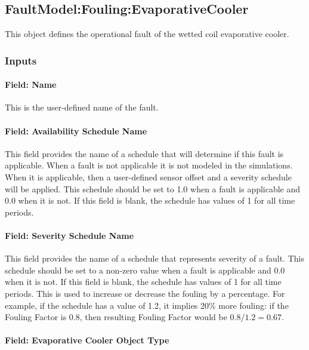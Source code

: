 \subsection{FaultModel:Fouling:EvaporativeCooler}\label{faultmodelfoulingevapcooler}

This object defines the operational fault of the wetted coil evaporative cooler.

\subsubsection{Inputs}

\paragraph{Field: Name}

This is the user-defined name of the fault.

\paragraph{Field: Availability Schedule Name}

This field provides the name of a schedule that will determine if this fault is applicable. When a fault is not applicable it is not modeled in the simulations. When it is applicable, then a user-defined sensor offset and a severity schedule will be applied. This schedule should be set to 1.0 when a fault is applicable and 0.0 when it is not. If this field is blank, the schedule has values of 1 for all time periods.

\paragraph{Field: Severity Schedule Name}

This field provides the name of a schedule that represents severity of a fault. This schedule should be set to a non-zero value when a fault is applicable and 0.0 when it is not. If this field is blank, the schedule has values of 1 for all time periods.
This is used to increase or decrease the fouling by a percentage. For example, if the schedule has a value of 1.2, it implies 20\% more fouling: if the Fouling Factor is 0.8, then resulting Fouling Factor would be $0.8 / 1.2 = 0.67$.

\paragraph{Field: Evaporative Cooler Object Type}\label{field-evaporative cooler-object-type}

